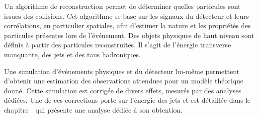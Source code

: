 \par
Un algorithme de reconstruction permet de déterminer quelles particules sont issues des collisions.
Cet algorithme se base sur les signaux du détecteur et leurs corrélations, en particulier spatiales, afin d'estimer la nature et les propriétés des particules présentes lors de l'événement.
Des objets physiques de haut niveau sont définis à partir des particules reconstruites.
Il s'agit de l'énergie transverse manquante, des jets et des taus hadroniques.
\par
Une simulation d'événements physiques et du détecteur lui-même permettent d'obtenir une estimation des observations attendues pour un modèle théorique donné.
Cette simulation est corrigée de divers effets, mesurés par des analyses dédiées.
Une de ces corrections porte sur l'énergie des jets
et est détaillée dans le chapitre~\
qui présente une analyse dédiée à son obtention.